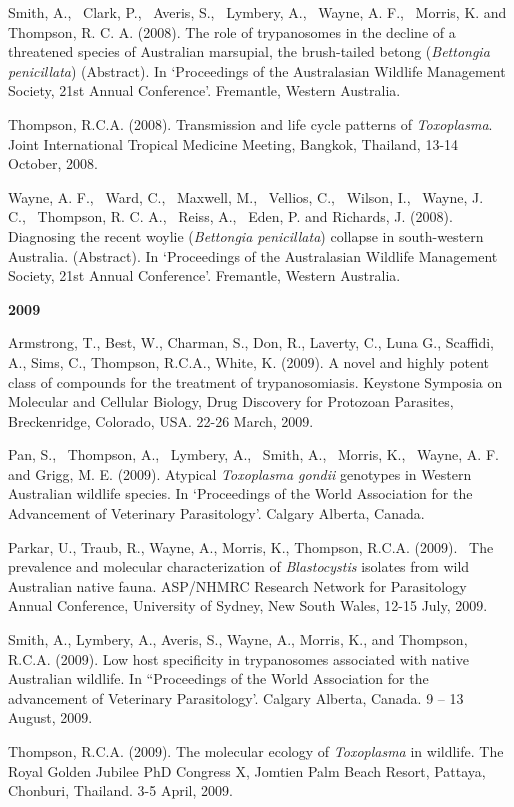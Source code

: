 \documentclass[version=last,
    paper=a4,                               %
    10pt,                                   %
    dvipsnames,
    oneside,                              %
    headings=openany,                       %
    open=any,
    BCOR=7mm,                               %
    DIV=15,     %
]{scrbook}
\begin{document}
Smith, A.,~ Clark, P.,~ Averis, S.,~ Lymbery, A.,~ Wayne, A. F.,~
Morris, K. and Thompson, R. C. A. (2008). The role of trypanosomes in
the decline of a threatened species of Australian marsupial, the
brush-tailed betong (\emph{Bettongia penicillata}) (Abstract). In
`Proceedings of the Australasian Wildlife Management Society, 21st
Annual Conference'. Fremantle, Western Australia.

Thompson, R.C.A. (2008). Transmission and life cycle patterns of
\emph{Toxoplasma}. Joint International Tropical Medicine Meeting,
Bangkok, Thailand, 13-14 October, 2008.

Wayne, A. F.,~ Ward, C.,~ Maxwell, M.,~ Vellios, C.,~ Wilson, I.,~
Wayne, J. C.,~ Thompson, R. C. A.,~ Reiss, A.,~ Eden, P. and Richards,
J. (2008). Diagnosing the recent woylie (\emph{Bettongia penicillata})
collapse in south-western Australia. (Abstract). In `Proceedings of the
Australasian Wildlife Management Society, 21st Annual Conference'.
Fremantle, Western Australia.

\textbf{2009}

Armstrong, T., Best, W., Charman, S., Don, R., Laverty, C., Luna G.,
Scaffidi, A., Sims, C., Thompson, R.C.A., White, K. (2009). A novel and
highly potent class of compounds for the treatment of trypanosomiasis.
Keystone Symposia on Molecular and Cellular Biology, Drug Discovery for
Protozoan Parasites, Breckenridge, Colorado, USA. 22-26 March, 2009.

Pan, S.,~ Thompson, A.,~ Lymbery, A.,~ Smith, A.,~ Morris, K.,~ Wayne,
A. F. and Grigg, M. E. (2009). Atypical \emph{Toxoplasma gondii}
genotypes in Western Australian wildlife species. In `Proceedings of the
World Association for the Advancement of Veterinary Parasitology'.
Calgary Alberta, Canada.

Parkar, U., Traub, R., Wayne, A., Morris, K., Thompson, R.C.A. (2009).~
The prevalence and molecular characterization of \emph{Blastocystis}
isolates from wild Australian native fauna. ASP/NHMRC Research Network
for Parasitology Annual Conference, University of Sydney, New South
Wales, 12-15 July, 2009.

Smith, A., Lymbery, A., Averis, S., Wayne, A., Morris, K., and Thompson,
R.C.A. (2009). Low host specificity in trypanosomes associated with
native Australian wildlife. In ``Proceedings of the World Association
for the advancement of Veterinary Parasitology'. Calgary Alberta,
Canada. 9 -- 13 August, 2009.

Thompson, R.C.A. (2009). The molecular ecology of \emph{Toxoplasma} in
wildlife. The Royal Golden Jubilee PhD Congress X, Jomtien Palm Beach
Resort, Pattaya, Chonburi, Thailand. 3-5 April, 2009.
\end{document}
